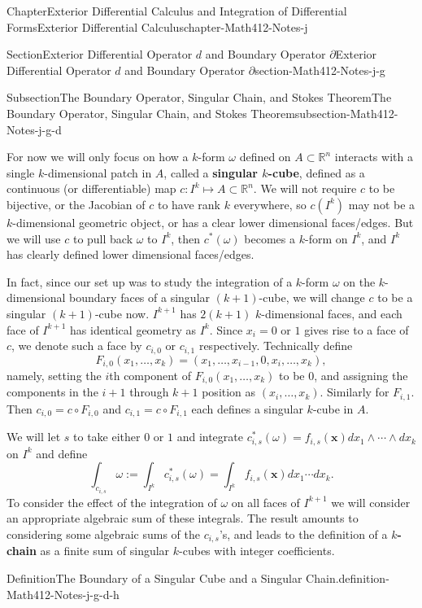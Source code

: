\documentclass[oneside,10pt,]{book}
\newcommand{\terminology}[1]{\textbf{#1}}
\numberwithin{equation}{section}
\newcommand{\bx}{\mathbf{x}}
\newcommand{\bbR}{\mathbb{R}}
\begin{document}
\begin{chapterptx}{Chapter}{Exterior Differential Calculus and Integration of Differential Forms}{}{Exterior Differential Calculus}{}{}{chapter-Math412-Notes-j}
\begin{sectionptx}{Section}{Exterior Differential Operator \(d\) and Boundary Operator \(\partial\)}{}{Exterior Differential Operator \(d\) and Boundary Operator \(\partial\)}{}{}{section-Math412-Notes-j-g}
\begin{subsectionptx}{Subsection}{The Boundary Operator, Singular Chain, and Stokes Theorem}{}{The Boundary Operator, Singular Chain, and Stokes Theorem}{}{}{subsection-Math412-Notes-j-g-d}
\par
For now we will only focus on how a \(k\)-form \(\omega\) defined on \(A\subset \bbR^{n}\) interacts with a single \(k\)-dimensional patch in \(A\), called a \terminology{singular \(k\)-cube}, defined as a continuous (or differentiable) map \(c: I^{k}\mapsto A\subset \bbR^{n}\). We will not require \(c\) to be bijective, or the Jacobian of \(c\) to have rank \(k\) everywhere, so \(c(I^{k})\) may not be a \(k\)-dimensional geometric object, or has a clear lower dimensional faces\slash{}edges. But we will use \(c\) to pull back \(\omega\) to \(I^{k}\), then \(c^{*}(\omega)\) becomes a \(k\)-form on \(I^{k}\), and \(I^{k}\) has clearly defined lower dimensional faces\slash{}edges.%
\par
In fact, since our set up was to study the integration of a \(k\)-form \(\omega\) on the \(k\)-dimensional boundary faces of a singular \((k+1)\)-cube, we will change \(c\) to be a singular \((k+1)\)-cube now. \(I^{k+1}\) has \(2(k+1)\) \(k\)-dimensional faces, and each face of \(I^{k+1}\) has identical geometry as \(I^{k}\). Since \(x_{i}=0\) or \(1\) gives rise to a face of \(c\), we denote such a face by \(c_{i, 0}\) or \(c_{i, 1}\) respectively. Technically define%
\begin{equation*}
F_{i, 0}(x_{1},\ldots, x_{k})=(x_{1},\ldots, x_{i-1}, 0, x_{i}, \ldots, x_{k}),
\end{equation*}
namely, setting the \(i\)th component of \(F_{i, 0}(x_{1},\ldots, x_{k})\) to be \(0\), and assigning the components in the \(i+1\) through \(k+1\) position as \((x_{i}, \ldots, x_{k})\). Similarly for \(F_{i, 1}\). Then \(c_{i, 0}=c\circ F_{i, 0}\) and \(c_{i, 1}=c\circ F_{i, 1}\) each defines a singular \(k\)-cube in \(A\).%
\par
We will let \(s\) to take either \(0\) or \(1\) and integrate \(c_{i, s}^{*}(\omega)=f_{i, s}(\bx)dx_{1}\wedge\cdots\wedge dx_{k}\) on \(I^{k}\) and define%
\begin{equation*}
\int_{c_{i, s} } \omega:= \int_{I^{k}} c_{i, s}^{*}(\omega)=\int_{I^{k}} f_{i, s}(\bx)dx_{1}\cdots dx_{k}.
\end{equation*}
To consider the effect of the integration of \(\omega\) on all faces of \(I^{k+1}\) we will consider an appropriate algebraic sum of these integrals. The result amounts to considering some algebraic sums of the \(c_{i, s}\)'s, and leads to the definition of a \terminology{\(k\)-chain} as a  finite sum of singular \(k\)-cubes with integer coefficients.%
\begin{definition}{Definition}{The Boundary of a Singular Cube and a Singular Chain.}{definition-Math412-Notes-j-g-d-h}%

\end{definition}
\end{subsectionptx}
\end{sectionptx}
\end{chapterptx}
\end{document}
